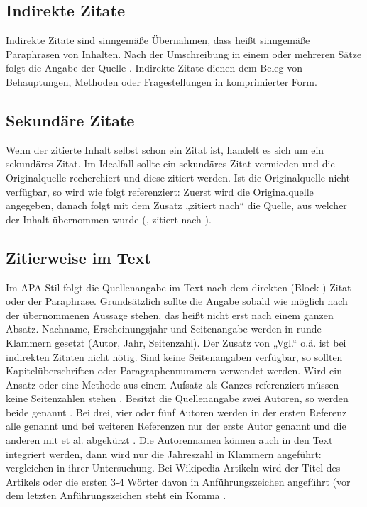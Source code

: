 \subsection{Indirekte Zitate}\label{subsubsec:indirekte}

Indirekte Zitate sind sinngemäße Übernahmen, dass heißt sinngemäße Paraphrasen von Inhalten. Nach der Umschreibung in einem oder mehreren Sätze folgt die Angabe der Quelle \cite[S. 11]{mustermann2013test}. Indirekte Zitate dienen dem Beleg von Behauptungen, Methoden oder Fragestellungen in komprimierter Form.

\subsection{Sekundäre Zitate}\label{subsubsec:sekundäre}

Wenn der zitierte Inhalt selbst schon ein Zitat ist, handelt es sich um ein sekundäres Zitat. Im Idealfall sollte ein sekundäres Zitat vermieden und die Originalquelle recherchiert und diese zitiert werden. Ist die Originalquelle nicht verfügbar, so wird wie folgt referenziert: Zuerst wird die Originalquelle angegeben, danach folgt mit dem Zusatz „zitiert nach“ die Quelle, aus welcher der Inhalt übernommen wurde (\citealp[S. 11]{mustermann2013test}, zitiert nach \citealp[S. 11]{huber2013buch}).

\subsection{Zitierweise im Text}\label{subsubsec:zitierweise}

Im APA-Stil folgt die Quellenangabe im Text nach dem direkten (Block-) Zitat oder der Paraphrase. Grundsätzlich sollte die Angabe sobald wie möglich nach der übernommenen Aussage stehen, das heißt nicht erst nach einem ganzen Absatz. Nachname, Erscheinungsjahr und Seitenangabe werden in runde Klammern gesetzt (Autor, Jahr, Seitenzahl). Der Zusatz von „Vgl.“ o.ä. ist bei indirekten Zitaten nicht nötig. Sind keine Seitenangaben verfügbar, so sollten Kapitelüberschriften oder Paragraphennummern verwendet werden. Wird ein Ansatz oder eine Methode aus einem Aufsatz als Ganzes referenziert müssen keine Seitenzahlen stehen \cite{mustermann2013test}. Besitzt die Quellenangabe zwei Autoren, so werden beide genannt \cite{mustermann2015gemeinsam}. Bei drei, vier oder fünf Autoren werden in der ersten Referenz alle genannt \cite*{mustermann2017viele} und bei weiteren Referenzen nur der erste Autor genannt und die anderen mit et al. abgekürzt \cite{mustermann2017viele}. Die Autorennamen können auch in den Text integriert werden, dann wird nur die Jahreszahl in Klammern angeführt: \citet{mustermann2013test} vergleichen in ihrer Untersuchung. Bei Wikipedia-Artikeln wird der Titel des Artikels oder die ersten 3-4 Wörter davon in Anführungszeichen angeführt (vor dem letzten Anführungszeichen steht ein Komma \cite{noauthor_wissenschaft_2020}.

